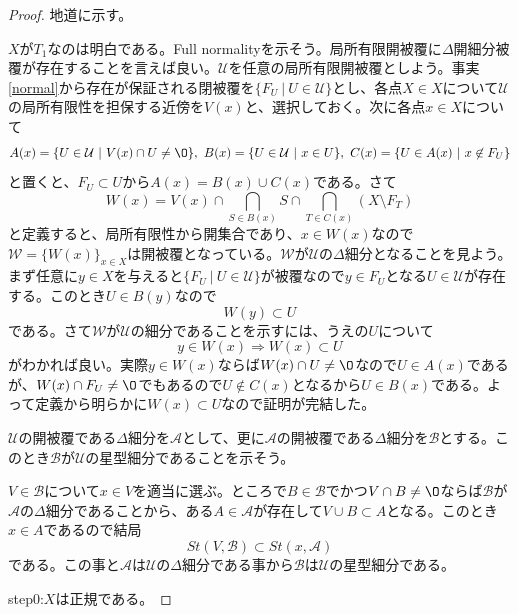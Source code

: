 \documentclass[leqno]{jsarticle}
\newcommand{\To}{\Longrightarrow}
\begin{document}
\begin{proof}地道に示す。\par 
[$(1)\To(2)$の証明]\par 
$X$が$T_1$なのは明白である。Full normalityを示そう。局所有限開被覆に$\Delta$開細分被覆が存在することを言えば良い。$\mathcal{U}$を任意の局所有限開被覆としよう。事実\ref{normal}から存在が保証される閉被覆を$\{F_U\ |\ U\in \mathcal{U}\}$とし、各点$X\in X$について$\mathcal{U}$の局所有限性を担保する近傍を$V(x)$と、選択しておく。次に各点$x\in X$について
\[
A(x)=\{U\in \mathcal{U}\ |\ V(x)\cap U\neq \O\},\ B(x)=\{U\in \mathcal{U}\ |\ x\in U\},\ C(x)=\{U\in A(x)\ |\ x\not\in F_U\}
\]
と置くと、$F_U\subset U$から$A(x)=B(x)\cup C(x)$である。さて
\[
W(x)=V(x)\cap \bigcap_{S\in B(x)}S\cap \bigcap_{T\in C(x)}\left(X\setminus F_T\right)
\]
と定義すると、局所有限性から開集合であり、$x\in W(x)$なので$\mathcal{W}=\{W(x)\}_{x\in X}$は開被覆となっている。$\mathcal{W}$が$\mathcal{U}$の$\Delta$細分となることを見よう。まず任意に$y\in X$を与えると$\{F_U\ |\ U\in \mathcal{U}\}$が被覆なので$y\in F_{U}$となる$U\in \mathcal{U}$が存在する。このとき$U\in B(y)$なので
\[
W(y)\subset U
\]
である。さて$\mathcal{W}$が$\mathcal{U}$の細分であることを示すには、うえの$U$について
\[
y\in W(x)\To W(x)\subset U
\]
がわかれば良い。実際$y\in W(x)$ならば$W(x)\cap U\neq \O$なので$U\in A(x)$であるが、$W(x)\cap F_U\neq\O$でもあるので$U\not\in C(x)$となるから$U\in B(x)$である。よって定義から明らかに$W(x)\subset U$なので証明が完結した。
\par[$(1)\To(2)$の証明終わり]\par
\par[$(2)\To(3)$の証明]\par 
$\mathcal{U}$の開被覆である$\Delta$細分を$\mathcal{A}$として、更に$\mathcal{A}$の開被覆である$\Delta$細分を$\mathcal{B}$とする。このとき$\mathcal{B}$が$\mathcal{U}$の星型細分であることを示そう。\par
$V\in \mathcal{B}$について$x\in V$を適当に選ぶ。ところで$B\in \mathcal{B}$でかつ$V\cap B\neq \O$ならば$\mathcal{B}$が$\mathcal{A}$の$\Delta$細分であることから、ある$A\in \mathcal{A}$が存在して$V\cup B\subset A$となる。このとき$x\in A$であるので結局
\[
St(V,\mathcal{B})\subset St(x,\mathcal{A})
\]
である。この事と$\mathcal{A}$は$\mathcal{U}$の$\Delta$細分である事から$\mathcal{B}$は$\mathcal{U}$の星型細分である。
\par[$(2)\To(3)$の証明終わり]\par
[$(3)\To(1)$の証明]\par
step0:$X$は正規である。\par

\end{proof}
\end{document}

